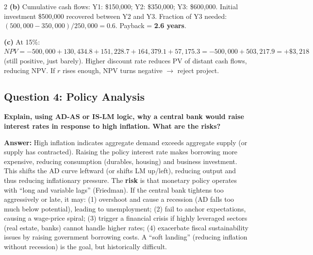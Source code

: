 \documentclass[10pt,a4paper]{article}
\begin{document}
\begin{multicols}{2}
\textbf{(b)} Cumulative cash flows: Y1: \$150,000; Y2: \$350,000; Y3: \$600,000. Initial investment \$500,000 recovered between Y2 and Y3. Fraction of Y3 needed: $(500,000 - 350,000) / 250,000 = 0.6$. Payback = \textbf{2.6 years}.

\textbf{(c)} At 15\%:
$NPV = -500,000 + 130,434.8 + 151,228.7 + 164,379.1 + 57,175.3 = -500,000 + 503,217.9 = +\$3,218$ (still positive, just barely). Higher discount rate reduces PV of distant cash flows, reducing NPV. If $r$ rises enough, NPV turns negative $\to$ reject project.

\vspace{0.2cm}

\subsection*{Question 4: Policy Analysis}
\textbf{Explain, using AD-AS or IS-LM logic, why a central bank would raise interest rates in response to high inflation. What are the risks?}

\vspace{0.05cm}
\textbf{Answer:} High inflation indicates aggregate demand exceeds aggregate supply (or supply has contracted). Raising the policy interest rate makes borrowing more expensive, reducing consumption (durables, housing) and business investment. This shifts the AD curve leftward (or shifts LM up/left), reducing output and thus reducing inflationary pressure. The \textbf{risk} is that monetary policy operates with ``long and variable lags'' (Friedman). If the central bank tightens too aggressively or late, it may: (1) overshoot and cause a recession (AD falls too much below potential), leading to unemployment; (2) fail to anchor expectations, causing a wage-price spiral; (3) trigger a financial crisis if highly leveraged sectors (real estate, banks) cannot handle higher rates; (4) exacerbate fiscal sustainability issues by raising government borrowing costs. A ``soft landing'' (reducing inflation without recession) is the goal, but historically difficult.

\end{multicols}
\end{document}
